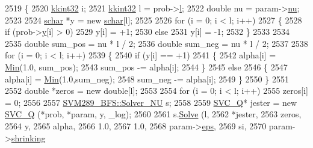 \begin{DoxyCode}
2519 \{
2520   \hyperlink{namespace_k_k_b_a8fa4952cc84fda1de4bec1fbdd8d5b1b}{kkint32}  i;
2521   \hyperlink{namespace_k_k_b_a8fa4952cc84fda1de4bec1fbdd8d5b1b}{kkint32}  l  = prob->\hyperlink{struct_s_v_m289___b_f_s_1_1svm__problem_afd75fe2ff65aa0c0f27b85b04028b2f3}{l};
2522   \textcolor{keywordtype}{double} nu = param->\hyperlink{struct_s_v_m289___b_f_s_1_1svm__parameter_a6f25339a407582eca1800e6561b24ebc}{nu};
2523 
2524   \hyperlink{namespace_s_v_m289___b_f_s_a67b51ac46a91cdb7ad72dea9fad6c0f0}{schar} *y = \textcolor{keyword}{new} \hyperlink{namespace_s_v_m289___b_f_s_a67b51ac46a91cdb7ad72dea9fad6c0f0}{schar}[l];
2525 
2526   \textcolor{keywordflow}{for}  (i = 0;  i < l;  i++)
2527   \{
2528     \textcolor{keywordflow}{if}  (prob->\hyperlink{struct_s_v_m289___b_f_s_1_1svm__problem_a6a79c81e0e6251913062a811c87d9325}{y}[i] > 0)
2529       y[i] = +1;
2530     \textcolor{keywordflow}{else}
2531       y[i] = -1;
2532   \}
2533 
2534 
2535   \textcolor{keywordtype}{double} sum\_pos = nu * l / 2;
2536   \textcolor{keywordtype}{double} sum\_neg = nu * l / 2;
2537 
2538   \textcolor{keywordflow}{for}  (i = 0;  i < l;  i++)
2539   \{
2540     \textcolor{keywordflow}{if}  (y[i] == +1)
2541     \{
2542       alpha[i] = \hyperlink{_raster_8cpp_a6261a282d8ed27242c636ad5fb658585}{Min}(1.0, sum\_pos);
2543       sum\_pos -= alpha[i];
2544     \}
2545     \textcolor{keywordflow}{else}
2546     \{
2547       alpha[i] = \hyperlink{_raster_8cpp_a6261a282d8ed27242c636ad5fb658585}{Min}(1.0,sum\_neg);
2548       sum\_neg -= alpha[i];
2549     \}
2550   \}
2551 
2552   \textcolor{keywordtype}{double} *zeros = \textcolor{keyword}{new} \textcolor{keywordtype}{double}[l];
2553 
2554   \textcolor{keywordflow}{for}  (i = 0;  i < l;  i++)
2555     zeros[i] = 0;
2556 
2557   \hyperlink{class_s_v_m289___b_f_s_1_1_solver___n_u}{SVM289\_BFS::Solver\_NU}  s;
2558 
2559   \hyperlink{class_s_v_m289___b_f_s_1_1_s_v_c___q}{SVC\_Q}*  jester = \textcolor{keyword}{new} \hyperlink{class_s_v_m289___b_f_s_1_1_s_v_c___q}{SVC\_Q} (*prob, *param, y, \_log);
2560 
2561   s.\hyperlink{class_s_v_m289___b_f_s_1_1_solver___n_u_a90214597a5a2a7ed797ee994f25e1b54}{Solve} (l, 
2562            *jester, 
2563            zeros, 
2564            y,
2565            alpha, 
2566            1.0, 
2567            1.0, 
2568            param->\hyperlink{struct_s_v_m289___b_f_s_1_1svm__parameter_ade212e0b6eafc29ce3402fd8945d0ebf}{eps}, 
2569            si,  
2570            param->\hyperlink{struct_s_v_m289___b_f_s_1_1svm__parameter_a6a9d76d8aa331811b0f7da59ebc5a79a}{shrinking}

\end{DoxyCode}
